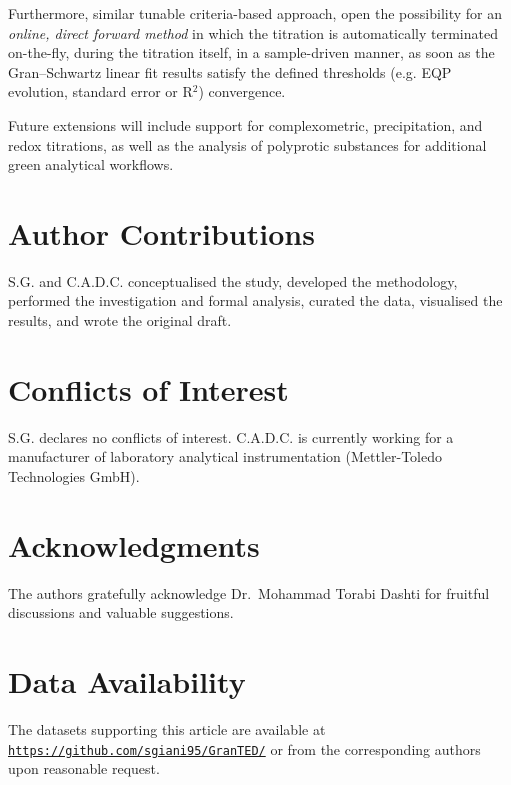 \documentclass[twoside,twocolumn,9pt]{article}
\begin{document}
Furthermore, similar tunable criteria-based approach, open the possibility for an {\it online, direct forward method} in which the titration is automatically terminated on-the-fly, during the titration itself, in a sample-driven manner, as soon as the Gran--Schwartz linear fit results satisfy the defined thresholds (e.g. EQP evolution, standard error or R$^2$) convergence.

Future extensions will include support for complexometric, precipitation, and redox titrations, as well as the analysis of polyprotic substances for additional green analytical workflows.

\section*{Author Contributions}

S.G. and C.A.D.C. conceptualised the study, developed the methodology, performed the investigation and formal analysis, curated the data, visualised the results, and wrote the original draft.%

\section*{Conflicts of Interest}

S.G. declares no conflicts of interest. C.A.D.C. is currently working for a manufacturer of laboratory analytical instrumentation (Mettler-Toledo Technologies GmbH).

\section*{Acknowledgments}

The authors gratefully acknowledge Dr.~Mohammad Torabi Dashti for fruitful discussions and valuable suggestions.

\section*{Data Availability}

The datasets supporting this article are available at \href{https://github.com/sgiani95/GranTED/}{\texttt{https://github.com/sgiani95/GranTED/}} or from the corresponding authors upon reasonable request.



\end{document}
